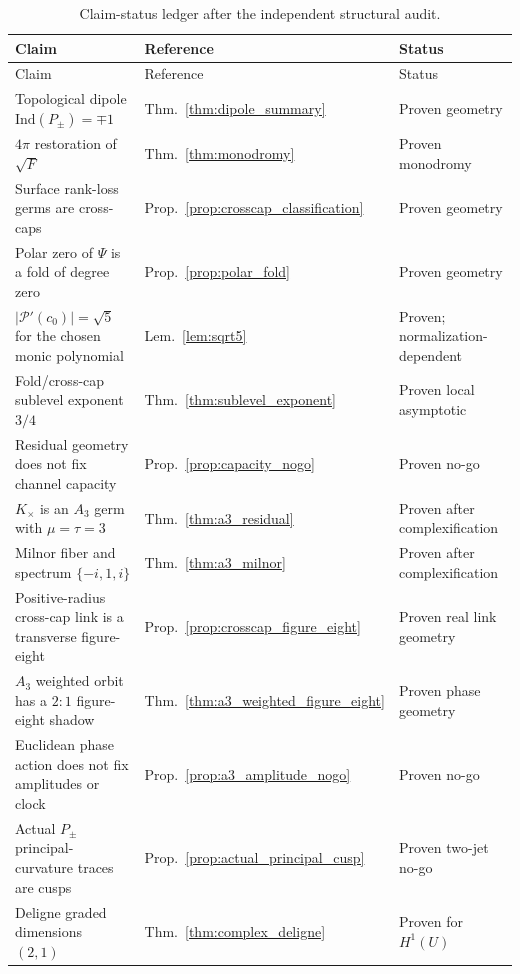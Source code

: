 \documentclass[11pt]{article}
\begin{document}
\bigskip
\footnotesize
\renewcommand{\arraystretch}{1.18}
\begin{longtable}{@{}>{\raggedright\arraybackslash}p{6.0cm}>{\raggedright\arraybackslash}p{2.0cm}>{\raggedright\arraybackslash}p{2.8cm}@{}}
\caption{Claim-status ledger after the independent structural audit.}
\label{tab:summary_status}\\
\toprule
Claim & Reference & Status \\
\midrule
\endfirsthead
\toprule
Claim & Reference & Status \\
\midrule
\endhead
Topological dipole $\mathrm{Ind}(P_\pm)=\mp1$ &
Thm.~\ref{thm:dipole_summary} & Proven geometry \\
$4\pi$ restoration of $\sqrt F$ &
Thm.~\ref{thm:monodromy} & Proven monodromy \\
Surface rank-loss germs are cross-caps &
Prop.~\ref{prop:crosscap_classification} & Proven geometry \\
Polar zero of $\Psi$ is a fold of degree zero &
Prop.~\ref{prop:polar_fold} & Proven geometry \\
$|\mathcal P'(c_0)|=\sqrt5$ for the chosen monic polynomial &
Lem.~\ref{lem:sqrt5} & Proven; normalization-dependent \\
Fold/cross-cap sublevel exponent $3/4$ &
Thm.~\ref{thm:sublevel_exponent} & Proven local asymptotic \\
Residual geometry does not fix channel capacity &
Prop.~\ref{prop:capacity_nogo} & Proven no-go \\
$K_\times$ is an $A_3$ germ with $\mu=\tau=3$ &
Thm.~\ref{thm:a3_residual} & Proven after complexification \\
Milnor fiber and spectrum $\{-i,1,i\}$ &
Thm.~\ref{thm:a3_milnor} & Proven after complexification \\
Positive-radius cross-cap link is a transverse figure-eight &
Prop.~\ref{prop:crosscap_figure_eight} & Proven real link geometry \\
$A_3$ weighted orbit has a $2:1$ figure-eight shadow &
Thm.~\ref{thm:a3_weighted_figure_eight} & Proven phase geometry \\
Euclidean phase action does not fix amplitudes or clock &
Prop.~\ref{prop:a3_amplitude_nogo} & Proven no-go \\
Actual $P_\pm$ principal-curvature traces are cusps &
Prop.~\ref{prop:actual_principal_cusp} & Proven two-jet no-go \\
Deligne graded dimensions $(2,1)$ &
Thm.~\ref{thm:complex_deligne} & Proven for $H^1(U)$ \\

\end{longtable}
\end{document}
